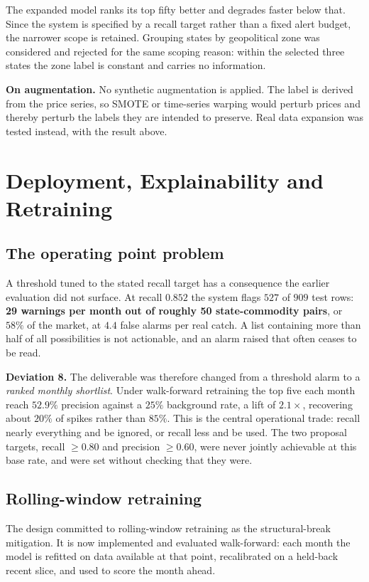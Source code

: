 \documentclass[conference]{IEEEtran}
\begin{document}
The expanded model ranks its top fifty better and degrades faster below that.
Since the system is specified by a recall target rather than a fixed alert
budget, the narrower scope is retained. Grouping states by geopolitical zone
was considered and rejected for the same scoping reason: within the selected
three states the zone label is constant and carries no information.

\textbf{On augmentation.} No synthetic augmentation is applied. The label is
derived from the price series, so SMOTE or time-series warping would perturb
prices and thereby perturb the labels they are intended to preserve. Real
data expansion was tested instead, with the result above.

\section{Deployment, Explainability and Retraining}
\label{sec:deploy}

\subsection{The operating point problem}

A threshold tuned to the stated recall target has a consequence the earlier
evaluation did not surface. At recall $0.852$ the system flags $527$ of $909$
test rows: \textbf{29 warnings per month out of roughly 50 state-commodity
pairs}, or $58\%$ of the market, at $4.4$ false alarms per real catch. A list
containing more than half of all possibilities is not actionable, and an alarm
raised that often ceases to be read.

\textbf{Deviation 8.} The deliverable was therefore changed from a threshold
alarm to a \emph{ranked monthly shortlist}. Under walk-forward retraining the
top five each month reach $52.9\%$ precision against a $25\%$ background rate,
a lift of $2.1\times$, recovering about $20\%$ of spikes rather than $85\%$.
This is the central operational trade: recall nearly everything and be ignored,
or recall less and be used. The two proposal targets, recall $\geq 0.80$ and
precision $\geq 0.60$, were never jointly achievable at this base rate, and
were set without checking that they were.

\subsection{Rolling-window retraining}

The design committed to rolling-window retraining as the structural-break
mitigation. It is now implemented and evaluated walk-forward: each month the
model is refitted on data available at that point, recalibrated on a held-back
recent slice, and used to score the month ahead.
\end{document}
